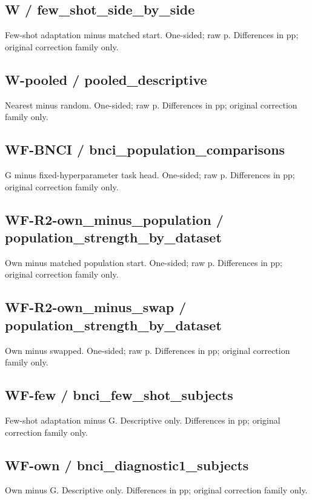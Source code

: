 \subsection*{W / few\_\allowbreak{}shot\_\allowbreak{}side\_\allowbreak{}by\_\allowbreak{}side}
Few-shot adaptation minus matched start. One-sided; raw p. Differences in pp; original correction family only. 

\subsection*{W-pooled / pooled\_\allowbreak{}descriptive}
Nearest minus random. One-sided; raw p. Differences in pp; original correction family only. 

\subsection*{WF-BNCI / bnci\_\allowbreak{}population\_\allowbreak{}comparisons}
G minus fixed-hyperparameter task head. One-sided; raw p. Differences in pp; original correction family only. 

\subsection*{WF-R2-own\_\allowbreak{}minus\_\allowbreak{}population / population\_\allowbreak{}strength\_\allowbreak{}by\_\allowbreak{}dataset}
Own minus matched population start. One-sided; raw p. Differences in pp; original correction family only. 

\subsection*{WF-R2-own\_\allowbreak{}minus\_\allowbreak{}swap / population\_\allowbreak{}strength\_\allowbreak{}by\_\allowbreak{}dataset}
Own minus swapped. One-sided; raw p. Differences in pp; original correction family only. 

\subsection*{WF-few / bnci\_\allowbreak{}few\_\allowbreak{}shot\_\allowbreak{}subjects}
Few-shot adaptation minus G. Descriptive only. Differences in pp; original correction family only. 

\subsection*{WF-own / bnci\_\allowbreak{}diagnostic1\_\allowbreak{}subjects}
Own minus G. Descriptive only. Differences in pp; original correction family only. 

